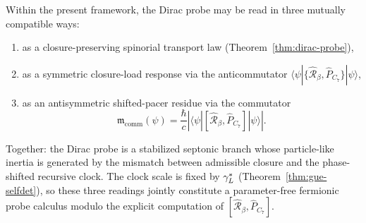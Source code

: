 \begin{proposition}
\label{prop:three-compatible-readings}
Within the present framework, the Dirac probe may be read in three
mutually compatible ways:
\begin{enumerate}[label=(\roman*)]
  \item as a closure-preserving spinorial transport law
        (Theorem~\ref{thm:dirac-probe}),
  \item as a symmetric closure-load response via the anticommutator
        $\langle\psi|\{\hat{\mathcal{R}}_\beta,\hat P_{C_7}\}|\psi\rangle$,
  \item as an antisymmetric shifted-pacer residue via the commutator
        \[
          \mathfrak{m}_{\mathrm{comm}}(\psi)
          = \frac{\hbar}{c}
            \left|\langle\psi|
            [\hat{\mathcal{R}}_\beta,\hat P_{C_7}]|\psi\rangle
            \right|.
        \]
\end{enumerate}
Together: the Dirac probe is a stabilized septonic branch whose
particle-like inertia is generated by the mismatch between admissible
closure and the phase-shifted recursive clock.
The clock scale is fixed by $\gamma_L^*$ (Theorem~\ref{thm:gue-selfdet}),
so these three readings jointly constitute a parameter-free fermionic
probe calculus modulo the explicit computation of
$[\hat{\mathcal{R}}_\beta,\hat P_{C_7}]$.
\end{proposition}



